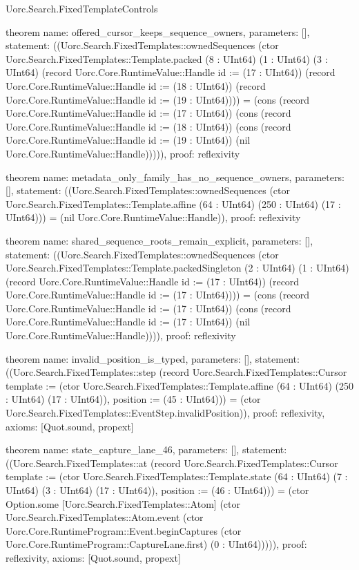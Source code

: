 \begin{lexlean}{Uorc.Search.FixedTemplateControls}
\begin{semanticmodule}
theorem{
  name: offered_cursor_keeps_sequence_owners,
  parameters: [],
  statement: ((Uorc.Search.FixedTemplates::ownedSequences (ctor Uorc.Search.FixedTemplates::Template.packed (8 : UInt64) (1 : UInt64) (3 : UInt64) (record Uorc.Core.RuntimeValue::Handle {id := (17 : UInt64)}) (record Uorc.Core.RuntimeValue::Handle {id := (18 : UInt64)}) (record Uorc.Core.RuntimeValue::Handle {id := (19 : UInt64)}))) = (cons (record Uorc.Core.RuntimeValue::Handle {id := (17 : UInt64)}) (cons (record Uorc.Core.RuntimeValue::Handle {id := (18 : UInt64)}) (cons (record Uorc.Core.RuntimeValue::Handle {id := (19 : UInt64)}) (nil Uorc.Core.RuntimeValue::Handle))))),
  proof: reflexivity{}
}

theorem{
  name: metadata_only_family_has_no_sequence_owners,
  parameters: [],
  statement: ((Uorc.Search.FixedTemplates::ownedSequences (ctor Uorc.Search.FixedTemplates::Template.affine (64 : UInt64) (250 : UInt64) (17 : UInt64))) = (nil Uorc.Core.RuntimeValue::Handle)),
  proof: reflexivity{}
}

theorem{
  name: shared_sequence_roots_remain_explicit,
  parameters: [],
  statement: ((Uorc.Search.FixedTemplates::ownedSequences (ctor Uorc.Search.FixedTemplates::Template.packedSingleton (2 : UInt64) (1 : UInt64) (record Uorc.Core.RuntimeValue::Handle {id := (17 : UInt64)}) (record Uorc.Core.RuntimeValue::Handle {id := (17 : UInt64)}))) = (cons (record Uorc.Core.RuntimeValue::Handle {id := (17 : UInt64)}) (cons (record Uorc.Core.RuntimeValue::Handle {id := (17 : UInt64)}) (nil Uorc.Core.RuntimeValue::Handle)))),
  proof: reflexivity{}
}

theorem{
  name: invalid_position_is_typed,
  parameters: [],
  statement: ((Uorc.Search.FixedTemplates::step (record Uorc.Search.FixedTemplates::Cursor {template := (ctor Uorc.Search.FixedTemplates::Template.affine (64 : UInt64) (250 : UInt64) (17 : UInt64)), position := (45 : UInt64)})) = (ctor Uorc.Search.FixedTemplates::EventStep.invalidPosition)),
  proof: reflexivity{},
  axioms: [Quot.sound, propext]
}

theorem{
  name: state_capture_lane_46,
  parameters: [],
  statement: ((Uorc.Search.FixedTemplates::at (record Uorc.Search.FixedTemplates::Cursor {template := (ctor Uorc.Search.FixedTemplates::Template.state (64 : UInt64) (7 : UInt64) (3 : UInt64) (17 : UInt64)), position := (46 : UInt64)})) = (ctor Option.some [Uorc.Search.FixedTemplates::Atom] (ctor Uorc.Search.FixedTemplates::Atom.event (ctor Uorc.Core.RuntimeProgram::Event.beginCaptures (ctor Uorc.Core.RuntimeProgram::CaptureLane.first) (0 : UInt64))))),
  proof: reflexivity{},
  axioms: [Quot.sound, propext]
}


\end{semanticmodule}
\end{lexlean}
